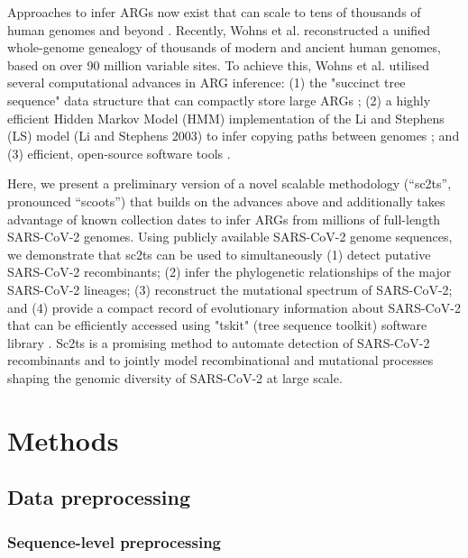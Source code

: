 \documentclass{article}
\begin{document}
Approaches to infer ARGs now exist that can scale to tens of thousands of human genomes and beyond \cite{Speidel2019-yh,Kelleher2019-ba,Zhang2021-lf,Schaefer2021-yg}. Recently, Wohns et al. \cite{Wohns2022-th} reconstructed a unified whole-genome genealogy of thousands of modern and ancient human genomes, based on over 90 million variable sites. To achieve this, Wohns et al. \cite{Wohns2022-th} utilised several computational advances in ARG inference: (1) the "succinct tree sequence" data structure that can compactly store large ARGs  \cite{Kelleher2018-xc}; (2) a highly efficient Hidden Markov Model (HMM) implementation of the Li and Stephens (LS) model (Li and Stephens 2003) to infer copying paths between genomes \cite{Kelleher2019-ba}; and (3) efficient, open-source software tools \cite{Baumdicker2022-ep,Kelleher2018-xc,Kelleher2019-ba,Wohns2022-th}.

Here, we present a preliminary version of a novel scalable methodology (“sc2ts”, pronounced “scoots”) that builds on the advances above and additionally takes advantage of known collection dates to infer ARGs from millions of full-length SARS-CoV-2 genomes. Using publicly available SARS-CoV-2 genome sequences, we demonstrate that sc2ts can be used to simultaneously (1) detect putative SARS-CoV-2 recombinants; (2) infer the phylogenetic relationships of the major SARS-CoV-2 lineages; (3) reconstruct the mutational spectrum of SARS-CoV-2; and (4) provide a compact record of evolutionary information about SARS-CoV-2 that can be efficiently accessed using "tskit" (tree sequence toolkit) software library \cite{Kelleher2018-xc}. Sc2ts is a promising method to automate detection of SARS-CoV-2 recombinants and to jointly model recombinational and mutational processes shaping the genomic diversity of SARS-CoV-2 at large scale.

\section{Methods}

\subsection{Data preprocessing}

\subsubsection{Sequence-level preprocessing}
\end{document}
